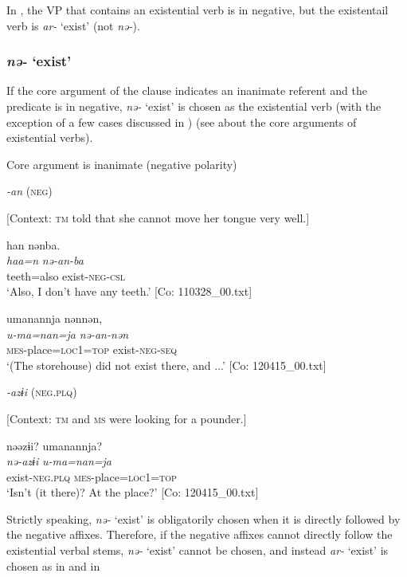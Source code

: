 In , the VP that contains an existential verb is in negative, but the existentail verb is \textit{ar-} ‘exist’ (not \textit{nə-}).

\subsubsection{\textit{nə-} ‘exist’}

If the core argument of the clause indicates an inanimate referent and the predicate is in negative, \textit{nə-} ‘exist’ is chosen as the existential verb (with the exception of a few cases discussed in ) (see  about the core arguments of existential verbs).

\ea\label{ex:8-34}
  Core argument is inanimate (negative polarity)

  \textit{-an} (\textsc{neg})

\ea{} [Context: \textsc{tm} told that she cannot move her tongue very well.]

{\TM}
\glll  han  nənba.\\
\textit{haa=n}  \textit{nə-an-ba}\\
teeth=also  exist-\textsc{neg}-\textsc{csl}\\
\glt ‘Also, I don’t have any teeth.’ [Co: 110328\_00.txt]

\ex
{\TM}
\glll  umanannja  nənnən,\\
\textit{u-ma=nan=ja}  \textit{nə-an-nən}\\
\textsc{mes}-place=\textsc{loc1}=\textsc{top}  exist-\textsc{neg}-\textsc{seq}\\
\glt ‘(The storehouse) did not exist there, and ...’ [Co: 120415\_00.txt]

  \textit{-azɨi} (\textsc{neg}.\textsc{plq})


\ex {}[Context: \textsc{tm} and \textsc{ms} were looking for a pounder.]

{\TM}
\glll  nəəzɨi?  umanannja?\\
\textit{nə-azɨi}  \textit{u-ma=nan=ja}\\
exist-\textsc{neg}.\textsc{plq}  \textsc{mes}-place=\textsc{loc1}=\textsc{top}\\
\glt ‘Isn’t (it there)? At the place?’ [Co: 120415\_00.txt]
\z
\z

Strictly speaking, \textit{nə-} ‘exist’ is obligatorily chosen when it is directly followed by the negative affixes. Therefore, if the negative affixes cannot directly follow the existential verbal stems, \textit{nə-} ‘exist’ cannot be chosen, and instead \textit{ar-} ‘exist’ is chosen as in  and  in 

